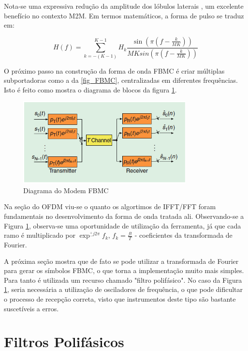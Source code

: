 \par Nota-se uma expressiva redução da amplitude dos lóbulos laterais \cite{Bellanger}, um excelente benefício no contexto M2M. Em termos matemáticos, a forma de pulso se traduz em\cite{Bellanger}: 

\begin{equation}\label{eq_freq}
H(f) = \sum_{k=-(K-1)}^{K-1}H_{k}\frac{\sin(\pi(f-\frac{k}{MK}))}{MKsin(\pi(f-\frac{k}{MK}))}
\end{equation}

\par O próximo passo na construção da forma de onda FBMC é criar múltiplas subportadoras como a da \ref{fig_FBMC}, centralizadas em diferentes frequências. Isto é feito como mostra o diagrama de blocos da figura \ref{Trans_FBMC}. 

\begin{figure}[h!]
\centering
\includegraphics[width=3.5in]{Trans_FBMC.png}
\caption{Diagrama do Modem FBMC \cite{Boroujeny}}
\label{Trans_FBMC}
\end{figure}

\par Na seção do OFDM viu-se o quanto os algortimos de IFFT/FFT foram fundamentais no desenvolvimento da forma de onda tratada ali. Observando-se a Figura \ref{Trans_FBMC}, observa-se uma oportunidade de utilização da ferramenta, já que cada ramo é multiplicado por $\exp^{^{+}_{-} j2\pi}{f_{k}}$, $f_{k} = \frac{ft}{T}$ - coeficientes da transformada de Fourier. 

\par A próxima seção mostra que de fato se pode utilizar a transformada de Fourier para gerar os símbolos FBMC, o que torna a implementação muito mais simples. Para tanto é utilizada um recurso chamado "filtro polifásico". No caso da Figura \ref{Trans_FBMC}, seria necessária a utilização de osciladores de frequência, o que pode dificultar o processo de recepção correta, visto que instrumentos deste tipo são bastante suscetíveis a erros. 

\section{Filtros Polifásicos}

